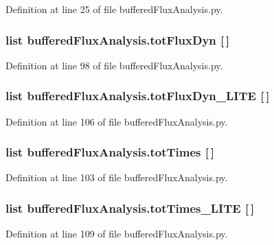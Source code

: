 Definition at line 25 of file buffered\-Flux\-Analysis.\-py.

\hypertarget{namespacebuffered_flux_analysis_a8f99b100d2f8191100ee93d633cb7a62}{
\subsubsection[{tot\-Flux\-Dyn}]{\setlength{\rightskip}{0pt plus 5cm}list buffered\-Flux\-Analysis.\-tot\-Flux\-Dyn \mbox{[}$\,$\mbox{]}}}\label{namespacebuffered_flux_analysis_a8f99b100d2f8191100ee93d633cb7a62}


Definition at line 98 of file buffered\-Flux\-Analysis.\-py.

\hypertarget{namespacebuffered_flux_analysis_afc46fc569c50ea77d9dd0a6a1e9eb438}{
\subsubsection[{tot\-Flux\-Dyn\-\_\-\-L\-I\-T\-E}]{\setlength{\rightskip}{0pt plus 5cm}list buffered\-Flux\-Analysis.\-tot\-Flux\-Dyn\-\_\-\-L\-I\-T\-E \mbox{[}$\,$\mbox{]}}}\label{namespacebuffered_flux_analysis_afc46fc569c50ea77d9dd0a6a1e9eb438}


Definition at line 106 of file buffered\-Flux\-Analysis.\-py.

\hypertarget{namespacebuffered_flux_analysis_a11c5182cf16d185b8ebd807aff4eb839}{
\subsubsection[{tot\-Times}]{\setlength{\rightskip}{0pt plus 5cm}list buffered\-Flux\-Analysis.\-tot\-Times \mbox{[}$\,$\mbox{]}}}\label{namespacebuffered_flux_analysis_a11c5182cf16d185b8ebd807aff4eb839}


Definition at line 103 of file buffered\-Flux\-Analysis.\-py.

\hypertarget{namespacebuffered_flux_analysis_afe01d8621771212d5e3d525f70d78090}{
\subsubsection[{tot\-Times\-\_\-\-L\-I\-T\-E}]{\setlength{\rightskip}{0pt plus 5cm}list buffered\-Flux\-Analysis.\-tot\-Times\-\_\-\-L\-I\-T\-E \mbox{[}$\,$\mbox{]}}}\label{namespacebuffered_flux_analysis_afe01d8621771212d5e3d525f70d78090}


Definition at line 109 of file buffered\-Flux\-Analysis.\-py.

